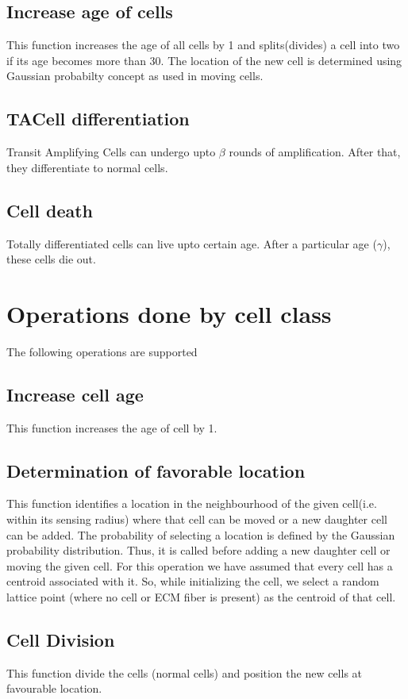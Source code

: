 \documentclass[11pt]{report}
\begin{document}
  \subsection{\color{blue}Increase age of cells}
  This function increases the age of all cells by 1 and splits(divides) a cell into two if its age becomes more than 30.
  The location of the new cell is determined using Gaussian probabilty concept as used in moving cells.
  
  \subsection{\color{blue}TACell differentiation}
  Transit Amplifying Cells can undergo upto $ \beta $ rounds of amplification. After that, they differentiate to normal cells.
  
  \subsection{\color{blue}Cell death}
  Totally differentiated cells can live upto certain age. After a particular age ($ \gamma $), these cells die out.

  \section{\color{red} Operations done by cell class}
  The following operations are supported
  \subsection{\color{blue}Increase cell age}
  This function increases the age of cell by 1.
  \subsection{\color{blue}Determination of favorable location}
  This function identifies a location in the neighbourhood of the given cell(i.e. within its sensing radius)  where that cell can be moved or a new daughter cell can be added. The probability of selecting a location is defined by the Gaussian probability distribution.
  Thus, it is called before adding a new daughter cell or moving the given cell.
  For this operation we have assumed that every cell has a centroid associated with it. So, while initializing the cell, we select a random lattice point (where no cell or ECM fiber is present) as the centroid of that cell.
  \subsection{\color{blue}Cell Division}
  This function divide the cells (normal cells) and position the new cells at favourable location.
  
\end{document}
